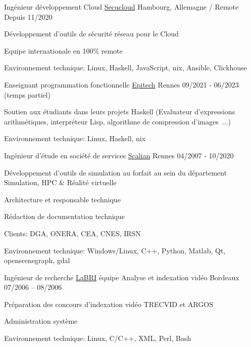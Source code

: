 \begin{cventries}
  \cventry
    {Ingénieur développement Cloud}
    {\href{https://www.linkedin.com/company/secucloud/}{Secucloud}}
    {Hambourg, Allemagne / Remote}
    {Depuis 11/2020}
    {
      \begin{cvitems}
        \item {Développement d'outils de sécurité réseau pour le Cloud}
        \item {Equipe internationale en 100\% remote}
        \item {Environnement technique: Linux, Haskell, JavaScript, nix,
            Ansible, Clickhouse}
      \end{cvitems}
    }

  \cventry
    {Enseignant programmation fonctionnelle}
    {\href{https://www.epitech.eu/}{Epitech}}
    {Rennes}
    {09/2021 - 06/2023 (temps partiel)}
    {
      \begin{cvitems}
          \item {Soutien aux étudiants dans leurs projets Haskell (Evaluateur
              d'expressions arithmétiques, interpréteur Lisp, algorithme de
              compression d'images~...)}
          \item {Environnement technique: Linux, Haskell, nix}
      \end{cvitems}
    }

  \cventry
    {Ingénieur d'étude en société de services}
    {\href{https://www.scalian.com/}{Scalian}}
    {Rennes}
    {04/2007 - 10/2020}
    {
      \begin{cvitems}
        \item {Développement d'outils de simulation au forfait au sein du
            département Simulation, HPC \& Réalité virtuelle}
        \item {Architecture et responsable technique}
        \item {Rédaction de documentation technique}
        \item {Clients: DGA, ONERA, CEA, CNES, IRSN}
        \item {Environnement technique: Windows/Linux, C++, Python, Matlab, Qt,
            openscenegraph, gdal}
      \end{cvitems}
    }

  \cventry
    {Ingénieur de recherche}
    {\href{https://www.labri.fr/}{LaBRI} équipe Analyse et indexation vidéo}
    {Bordeaux}
    {07/2006 – 08/2006}
    {
      \begin{cvitems}
        \item {Préparation des concours d'indexation vidéo TRECVID et ARGOS}
        \item {Administration système}
        \item {Environnement technique: Linux, C/C++, XML, Perl, Bash}
      \end{cvitems}
    }


\end{cventries}
